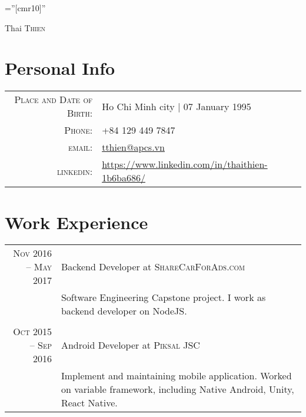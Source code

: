 \documentclass[a4paper,10pt]{article}
\begin{document}

\pagestyle{empty} %

\font\fb=''[cmr10]'' %

\par{\centering
		{\Huge Thai \textsc{Thien}
	}\bigskip\par}

\section{Personal Info}

\begin{tabular}{rl}
    \textsc{Place and Date of Birth:} & Ho Chi Minh city  | 07 January 1995 \\
    \textsc{Phone:}     & +84 129 449 7847\\
    \textsc{email:}     & \href{mailto:tthien@apcs.vn}{tthien@apcs.vn}\\
    \textsc{linkedin:} & \href{https://www.linkedin.com/in/thaithien-1b6ba686/}{https://www.linkedin.com/in/thaithien-1b6ba686/}
\end{tabular}

\section{Work Experience}

\begin{tabular}{r|p{11cm}}

\textsc{Nov 2016 – May 2017} & Backend Developer at \textsc{ShareCarForAds.com} \\&\footnotesize{Software Engineering Capstone project. I work as backend developer on NodeJS.} \\\multicolumn{2}{c}{} \\
 
\textsc{Oct 2015 – Sep 2016} & Android Developer at \textsc{Piksal JSC} \\&\footnotesize{Implement and maintaining mobile application. Worked on variable framework, including Native Android, Unity, React Native.}


\end{tabular}
\end{document}
